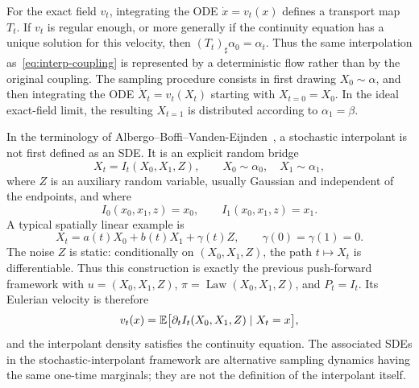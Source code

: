 For the exact field $v_t$, integrating the ODE $\dot{x}=v_t(x)$ defines a transport map $T_t$. If $v_t$ is regular enough, or more generally if the continuity equation has a unique solution for this velocity, then $(T_t)_\sharp\alpha_0=\alpha_t$. Thus the same interpolation as~\eqref{eq:interp-coupling} is represented by a deterministic flow rather than by the original coupling.
The sampling procedure consists in first drawing $X_0 \sim \alpha$, and then integrating the ODE $\dot{X}_t = v_t(X_t)$ starting with $X_{t=0} = X_0$.
In the ideal exact-field limit, the resulting $X_{t=1}$ is distributed according to $\alpha_1 = \beta$.

\begin{rem}\label{rem-static-noise-stochastic-interpolants}
In the terminology of Albergo--Boffi--Vanden-Eijnden~\cite{Albergo2025StochasticInterpolants}, a stochastic interpolant is not first defined as an SDE. It is an explicit random bridge
\[
    X_t = I_t(X_0,X_1,Z),
    \qquad X_0\sim\alpha_0,\quad X_1\sim\alpha_1,
\]
where $Z$ is an auxiliary random variable, usually Gaussian and independent of the endpoints, and where
\[
    I_0(x_0,x_1,z)=x_0,
    \qquad
    I_1(x_0,x_1,z)=x_1.
\]
A typical spatially linear example is
\[
    X_t=a(t)X_0+b(t)X_1+\gamma(t)Z,
    \qquad
    \gamma(0)=\gamma(1)=0.
\]
The noise $Z$ is static: conditionally on $(X_0,X_1,Z)$, the path $t\mapsto X_t$ is differentiable. Thus this construction is exactly the previous push-forward framework with $u=(X_0,X_1,Z)$, $\pi=\operatorname{Law}(X_0,X_1,Z)$, and $P_t=I_t$. Its Eulerian velocity is therefore
\[
    v_t(x)=\mathbb{E}\bigl[\partial_t I_t(X_0,X_1,Z)\mid X_t=x\bigr],
\]
and the interpolant density satisfies the continuity equation. The associated SDEs in the stochastic-interpolant framework are alternative sampling dynamics having the same one-time marginals; they are not the definition of the interpolant itself.
\end{rem}


